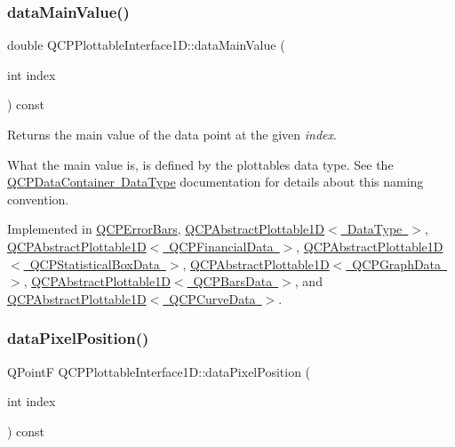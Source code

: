 \subsubsection{\texorpdfstring{dataMainValue()}{dataMainValue()}}
{\footnotesize\ttfamily double Q\+C\+P\+Plottable\+Interface1\+D\+::data\+Main\+Value (\begin{DoxyParamCaption}\item[{int}]{index }\end{DoxyParamCaption}) const\hspace{0.3cm}{\ttfamily [pure virtual]}}

Returns the main value of the data point at the given {\itshape index}.

What the main value is, is defined by the plottable\textquotesingle{}s data type. See the \mbox{\hyperlink{class_q_c_p_data_container_qcpdatacontainer-datatype}{Q\+C\+P\+Data\+Container Data\+Type}} documentation for details about this naming convention. 

Implemented in \mbox{\hyperlink{class_q_c_p_error_bars_ae9f6c79c03147efb1a67742c55386dc8}{Q\+C\+P\+Error\+Bars}}, \mbox{\hyperlink{class_q_c_p_abstract_plottable1_d_a6be0f657ba85a1688336d76ad649ecf2}{Q\+C\+P\+Abstract\+Plottable1\+D$<$ Data\+Type $>$}}, \mbox{\hyperlink{class_q_c_p_abstract_plottable1_d_a6be0f657ba85a1688336d76ad649ecf2}{Q\+C\+P\+Abstract\+Plottable1\+D$<$ Q\+C\+P\+Financial\+Data $>$}}, \mbox{\hyperlink{class_q_c_p_abstract_plottable1_d_a6be0f657ba85a1688336d76ad649ecf2}{Q\+C\+P\+Abstract\+Plottable1\+D$<$ Q\+C\+P\+Statistical\+Box\+Data $>$}}, \mbox{\hyperlink{class_q_c_p_abstract_plottable1_d_a6be0f657ba85a1688336d76ad649ecf2}{Q\+C\+P\+Abstract\+Plottable1\+D$<$ Q\+C\+P\+Graph\+Data $>$}}, \mbox{\hyperlink{class_q_c_p_abstract_plottable1_d_a6be0f657ba85a1688336d76ad649ecf2}{Q\+C\+P\+Abstract\+Plottable1\+D$<$ Q\+C\+P\+Bars\+Data $>$}}, and \mbox{\hyperlink{class_q_c_p_abstract_plottable1_d_a6be0f657ba85a1688336d76ad649ecf2}{Q\+C\+P\+Abstract\+Plottable1\+D$<$ Q\+C\+P\+Curve\+Data $>$}}.

\mbox{\label{class_q_c_p_plottable_interface1_d_a78911838cfbcfd2d8df9ad2fdbfb8e93}} 
\subsubsection{\texorpdfstring{dataPixelPosition()}{dataPixelPosition()}}
{\footnotesize\ttfamily Q\+PointF Q\+C\+P\+Plottable\+Interface1\+D\+::data\+Pixel\+Position (\begin{DoxyParamCaption}\item[{int}]{index }\end{DoxyParamCaption}) const\hspace{0.3cm}{\ttfamily [pure virtual]}}

